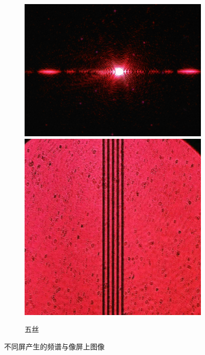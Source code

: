 \documentclass[a4paper]{article}
\begin{document}
\begin{figure}[htbp]
\begin{subfigure}[htbp]{0.3\textwidth}
        \includegraphics[width=\textwidth]{fre-done/3-8.JPG}
        \includegraphics[width=\textwidth]{img-done/3-8.JPG}
        \caption{五丝}
        \label{3-8}
    \end{subfigure}
    \captionsetup{format=cont,justification=centering,subrefformat=parens}
    \caption{不同屏产生的频谱与像屏上图像}
\end{figure}
\clearpage
\end{document}
